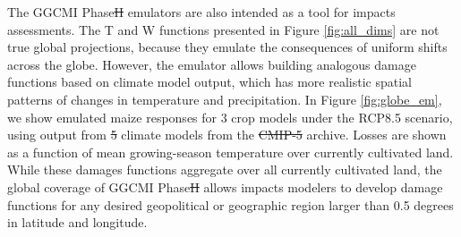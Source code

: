 \documentclass[gmdd]{copernicus} %
\providecommand{\DIFadd}[1]{{\protect\color{blue}\uwave{#1}}} %
\providecommand{\DIFdel}[1]{{\protect\color{red}\sout{#1}}}                      %
\providecommand{\DIFaddbegin}{} %
\providecommand{\DIFaddend}{} %
\providecommand{\DIFdelbegin}{} %
\providecommand{\DIFdelend}{} %
\begin{document}
The GGCMI Phase\DIFdelbegin \DIFdel{II }\DIFdelend \DIFaddbegin \DIFadd{~2 }\DIFaddend emulators are also intended as a tool for impacts assessments.
The T and W functions presented in Figure \ref{fig:all_dims} are not true global projections, because they emulate the consequences of uniform shifts across the globe.
However, the emulator allows building analogous damage functions based on climate model output, which has more realistic spatial patterns of changes in temperature and precipitation. 
In Figure \ref{fig:globe_em}, we show emulated maize responses for 3 crop models under the RCP8.5 scenario, using output from \DIFdelbegin \DIFdel{5 }\DIFdelend \DIFaddbegin \DIFadd{3 }\DIFaddend climate models from the \DIFdelbegin \DIFdel{CMIP-5 }\DIFdelend \DIFaddbegin \DIFadd{CMIP5 }\DIFaddend archive. 
Losses are shown as a function of mean growing-season temperature over currently cultivated land. While these damages functions aggregate over all currently cultivated land, the global coverage of GGCMI Phase\DIFdelbegin \DIFdel{II }\DIFdelend \DIFaddbegin \DIFadd{~2 }\DIFaddend allows impacts modelers to develop damage functions for any desired geopolitical or geographic region larger than 0.5 degrees in latitude and longitude. 
\end{document}
